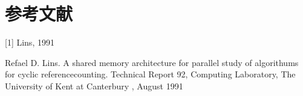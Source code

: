 \chapter{参考文献}
\label{chap:bib}
[1] Lins, 1991
\label{bib:lins}

Refael D. Lins. A shared memory architecture for parallel study of algorithums for cyclic reference\textunderscore{}counting. Technical Report 92, Computing Laboratory, The University of Kent at Canterbury , August 1991

